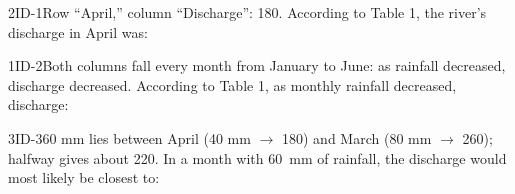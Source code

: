 \documentclass[11pt]{article}
\begin{document}
\begin{q}{2}{ID-1}{Row ``April,'' column ``Discharge'': 180.}
According to Table 1, the river's discharge in April was:
\end{q}

\begin{q}{1}{ID-2}{Both columns fall every month from January to June: as rainfall decreased, discharge decreased.}
According to Table 1, as monthly rainfall decreased, discharge:
\end{q}

\begin{q}{3}{ID-3}{60 mm lies between April (40 mm $\to$ 180) and March (80 mm $\to$ 260); halfway gives about 220.}
In a month with \SI{60}{\milli\metre} of rainfall, the discharge would most likely be closest to:
\end{q}

\makekey
\end{document}
